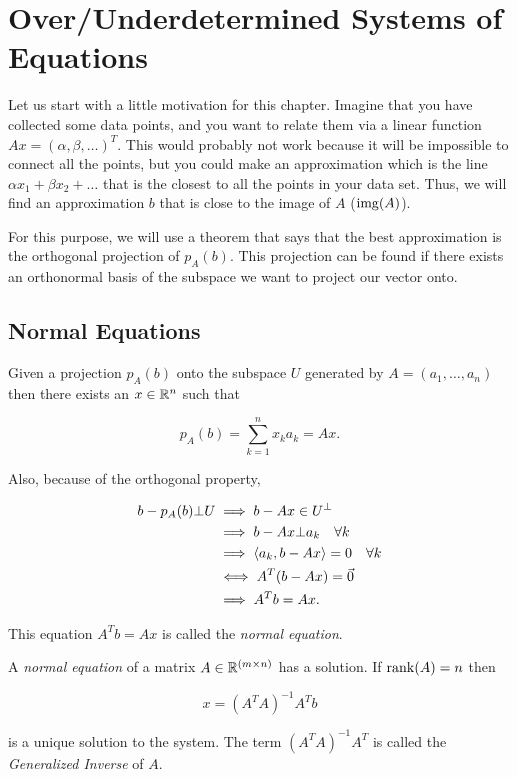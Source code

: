 \chapter{Over/Underdetermined Systems of Equations}

Let us start with a little motivation for this chapter. Imagine that you have collected some data points, 
and you want to relate them via a linear function \(Ax = (\alpha, \beta, \dots)^T\). This would probably 
not work because it will be impossible to connect all the points, but you could make an approximation 
which is the line \(\alpha x_1 + \beta x_2 + \dots\) that is the closest to all the points in your data 
set. Thus, we will find an approximation 
\(b\) that is close to the image of \(A\) (\(\mathrm{img}(A)\)).

For this purpose, we will use a theorem that says that the best approximation is the orthogonal projection of 
\(p_A (b)\). This projection can be found if there exists an orthonormal basis of the subspace we want to 
project our vector onto.

\section{Normal Equations}

Given a projection \(p_A (b)\) onto the subspace \(U\) generated by \(A = (a_1, \dots, a_n)\) then there 
exists an \(x \in \mathbb{R}^n\) such that 

\[
	p_{A}(b) = \sum_{k = 1}^{n} x_k a_k = Ax.
\]

Also, because of the orthogonal property,

\begin{align*}
	b - p_{A}(b) \bot U &\implies b - Ax  \in U^{\bot}\\
						&\implies b - Ax \bot a_k \quad \forall k\\
						&\implies \left\langle a_k, b - Ax\right\rangle = 0 \quad \forall k\\
						&\iff A^{T} (b - Ax) = \vec{0}\\
						&\implies A^{T}b = Ax.
\end{align*}

This equation \(A^{T}b = Ax\) is called the \emph{normal equation}.

A \emph{normal equation} of a matrix \(A \in \mathbb{R}^{(m \times n)}\) has a solution. 
If \(\mathrm{rank}(A) = n\) then 

\[
	x = {(A^T A)}^{-1} A^T b
\]

is a unique solution to the system. The term \({(A^T A)}^{-1}A^T\) is called the 
\emph{Generalized Inverse} of \(A\).

